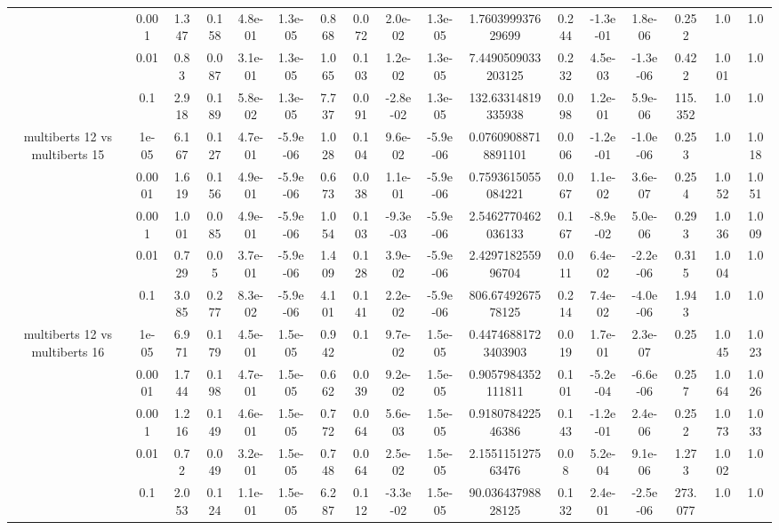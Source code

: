 \begin{tabular}{|c|c|c|c|c|c|c|c|c|c|c|c|c|c|c|c|c|}
 & 0.001 & 1.347 & 0.158 & 4.8e-01 & 1.3e-05 & 0.868 & 0.072 & 2.0e-02 & 1.3e-05 & 1.760399937629699 & 0.244 & -1.3e-01 & 1.8e-06 & 0.252 & 1.0 & 1.0 \\
 & 0.01 & 0.83 & 0.087 & 3.1e-01 & 1.3e-05 & 1.065 & 0.103 & 1.2e-02 & 1.3e-05 & 7.4490509033203125 & 0.232 & 4.5e-03 & -1.3e-06 & 0.422 & 1.001 & 1.0 \\
 & 0.1 & 2.918 & 0.189 & 5.8e-02 & 1.3e-05 & 7.737 & 0.091 & -2.8e-02 & 1.3e-05 & 132.63314819335938 & 0.098 & 1.2e-01 & 5.9e-06 & 115.352 & 1.0 & 1.0 \\
\hline
\multirow{5}{*}{multiberts 12 vs multiberts 15} & 1e-05 & 6.167 & 0.127 & 4.7e-01 & -5.9e-06 & 1.028 & 0.104 & 9.6e-02 & -5.9e-06 & 0.07609088718891101 & 0.006 & -1.2e-01 & -1.0e-06 & 0.253 & 1.0 & 1.018 \\
 & 0.0001 & 1.619 & 0.156 & 4.9e-01 & -5.9e-06 & 0.673 & 0.038 & 1.1e-01 & -5.9e-06 & 0.7593615055084221 & 0.067 & 1.1e-02 & 3.6e-07 & 0.254 & 1.052 & 1.051 \\
 & 0.001 & 1.001 & 0.085 & 4.9e-01 & -5.9e-06 & 1.054 & 0.103 & -9.3e-03 & -5.9e-06 & 2.5462770462036133 & 0.167 & -8.9e-02 & 5.0e-06 & 0.293 & 1.036 & 1.009 \\
 & 0.01 & 0.729 & 0.05 & 3.7e-01 & -5.9e-06 & 1.409 & 0.128 & 3.9e-02 & -5.9e-06 & 2.429718255996704 & 0.011 & 6.4e-02 & -2.2e-06 & 0.315 & 1.004 & 1.0 \\
 & 0.1 & 3.085 & 0.277 & 8.3e-02 & -5.9e-06 & 4.101 & 0.141 & 2.2e-02 & -5.9e-06 & 806.6749267578125 & 0.214 & 7.4e-02 & -4.0e-06 & 1.943 & 1.0 & 1.0 \\
\hline
\multirow{5}{*}{multiberts 12 vs multiberts 16} & 1e-05 & 6.971 & 0.179 & 4.5e-01 & 1.5e-05 & 0.942 & 0.1 & 9.7e-02 & 1.5e-05 & 0.44746881723403903 & 0.019 & 1.7e-01 & 2.3e-07 & 0.25 & 1.045 & 1.023 \\
 & 0.0001 & 1.744 & 0.198 & 4.7e-01 & 1.5e-05 & 0.662 & 0.039 & 9.2e-02 & 1.5e-05 & 0.9057984352111811 & 0.101 & -5.2e-04 & -6.6e-06 & 0.257 & 1.064 & 1.026 \\
 & 0.001 & 1.216 & 0.149 & 4.6e-01 & 1.5e-05 & 0.772 & 0.064 & 5.6e-03 & 1.5e-05 & 0.918078422546386 & 0.143 & -1.2e-01 & 2.4e-06 & 0.252 & 1.073 & 1.033 \\
 & 0.01 & 0.72 & 0.049 & 3.2e-01 & 1.5e-05 & 0.748 & 0.064 & 2.5e-02 & 1.5e-05 & 2.155115127563476 & 0.08 & 5.2e-04 & 9.1e-06 & 1.273 & 1.002 & 1.0 \\
 & 0.1 & 2.053 & 0.124 & 1.1e-01 & 1.5e-05 & 6.287 & 0.112 & -3.3e-02 & 1.5e-05 & 90.03643798828125 & 0.132 & 2.4e-01 & -2.5e-06 & 273.077 & 1.0 & 1.0 \\

\end{tabular}
